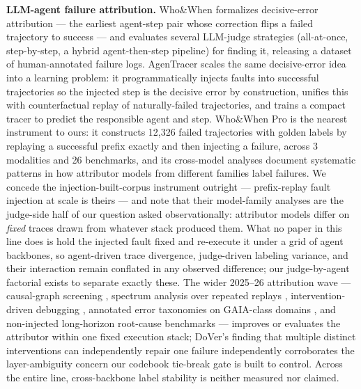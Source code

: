 \documentclass[11pt]{article}
\begin{document}
\textbf{LLM-agent failure attribution.} Who\&When \citep{WhoWhen2025} formalizes decisive-error attribution --- the earliest agent-step pair whose correction flips a failed trajectory to success --- and evaluates several LLM-judge strategies (all-at-once, step-by-step, a hybrid agent-then-step pipeline) for finding it, releasing a dataset of human-annotated failure logs. AgenTracer \citep{AgenTracer2025} scales the same decisive-error idea into a learning problem: it programmatically injects faults into successful trajectories so the injected step is the decisive error by construction, unifies this with counterfactual replay of naturally-failed trajectories, and trains a compact tracer to predict the responsible agent and step. Who\&When Pro \citep{WhoWhenPro2026} is the nearest instrument to ours: it constructs 12,326 failed trajectories with golden labels by replaying a successful prefix exactly and then injecting a failure, across 3 modalities and 26 benchmarks, and its cross-model analyses document systematic patterns in how attributor models from different families label failures. We concede the injection-built-corpus instrument outright --- prefix-replay fault injection at scale is theirs --- and note that their model-family analyses are the judge-side half of our question asked observationally: attributor models differ on \emph{fixed} traces drawn from whatever stack produced them. What no paper in this line does is hold the injected fault fixed and re-execute it under a grid of agent backbones, so agent-driven trace divergence, judge-driven labeling variance, and their interaction remain conflated in any observed difference; our judge-by-agent factorial exists to separate exactly these. The wider 2025--26 attribution wave --- causal-graph screening \citep{CHIEF2026}, spectrum analysis over repeated replays \citep{FAMAS2025}, intervention-driven debugging \citep{DoVer2025}, annotated error taxonomies on GAIA-class domains \citep{AgentErrorBench2025}, and non-injected long-horizon root-cause benchmarks \citep[concurrent with this work]{LongRCA2026} --- improves or evaluates the attributor within one fixed execution stack; DoVer's finding that multiple distinct interventions can independently repair one failure independently corroborates the layer-ambiguity concern our codebook tie-break gate is built to control. Across the entire line, cross-backbone label stability is neither measured nor claimed.
\end{document}
